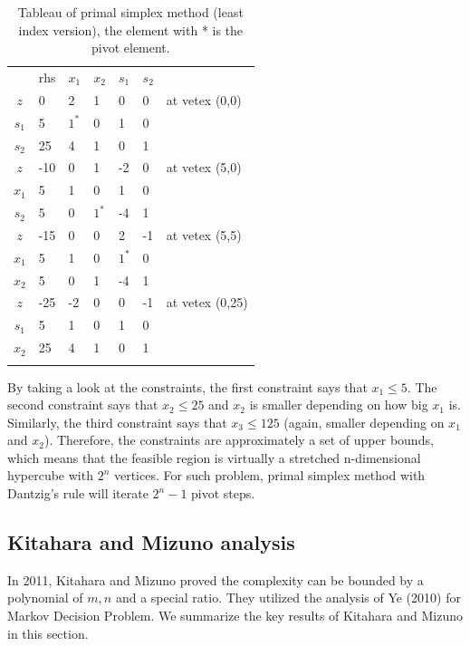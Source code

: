 \documentclass[11pt]{article}
\begin{document}
\begin{table}[H]
\caption{Tableau of primal simplex method (least index version), the element with * is the pivot element. }
\label{Table: tableau}
\centering
\begin{tabular}{c|llllll}
   & rhs & $x_1$ & $x_2$ & $s_1$ & $s_2$ &                 \\ \cline{1-6}
$z$  & 0   & 2  & 1  & 0  & 0  & at vetex (0,0)  \\
$s_1$ & 5   & $1^*$  & 0  & 1  & 0  &                 \\
$s_2$ & 25  & 4  & 1  & 0  & 1  &                 \\ \hhline{======}
$z$  & -10 & 0  & 1  & -2 & 0  & at vetex (5,0)  \\
$x_1$ & 5   & 1  & 0  & 1  & 0  &                 \\
$s_2$ & 5   & 0  & $1^*$  & -4 & 1  &                 \\ \hhline{======}
$z$  & -15 & 0  & 0  & 2  & -1 & at vetex (5,5)  \\
$x_1$ & 5   & 1  & 0  & $1^*$  & 0  &                 \\
$x_2$ & 5   & 0  & 1  & -4 & 1  &                 \\ \hhline{======}
$z$  & -25 & -2 & 0  & 0  & -1 & at vetex (0,25) \\
$s_1$ & 5   & 1  & 0  & 1  & 0  &                 \\
$x_2$ & 25  & 4  & 1  & 0  & 1  &                 \\ \hhline{======}
\end{tabular}
\end{table}
By taking a look at the constraints, the first constraint says that $x_1 \le 5$. The second constraint says that $x_2 \le 25$ and $x_2$ is smaller depending on how big $x_1$ is. Similarly, the third constraint says that $x_3 \le 125$ (again, smaller depending on $x_1$ and $x_2$). Therefore, the constraints are approximately a set of upper bounds, which means that the feasible region is virtually a stretched n-dimensional hypercube with $2^n$ vertices. For such problem, primal simplex method with Dantzig's rule will iterate $2^n -1$ pivot steps.

\subsection{Kitahara and Mizuno analysis} \label{seckita}
In 2011, Kitahara and Mizuno \cite{kitahara2013bound} proved the complexity can be bounded by a polynomial of $m, n$ and a special ratio. They utilized the analysis of Ye (2010) \cite{ye2010simplex} for Markov Decision Problem. We summarize the key results of Kitahara and Mizuno \cite{kitahara2013bound} in this section. 
\end{document}
